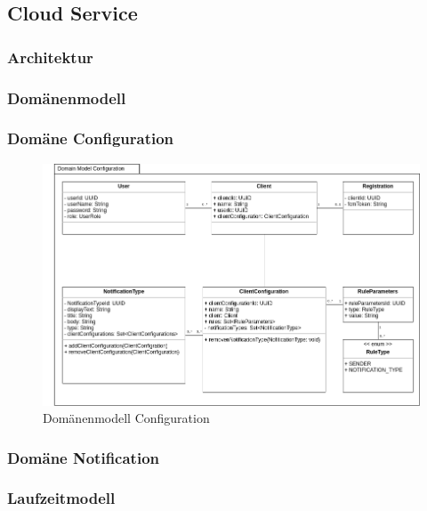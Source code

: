 
\subsection{Cloud Service}\label{subsec:cloud-service}

\subsubsection{Architektur}

\clearpage

\subsubsection{Domänenmodell}

\subsubsection*{Domäne Configuration}

\begin{figure}[h]
    \centering
    \begin{minipage}[b]{1.0\textwidth}
        \includegraphics[width=\textwidth]{graphics/Class_Configuration_Domain}
        \caption{Domänenmodell Configuration}
    \end{minipage}
\end{figure}


\subsubsection*{Domäne Notification}


\clearpage
\subsubsection{Laufzeitmodell}

\clearpage
